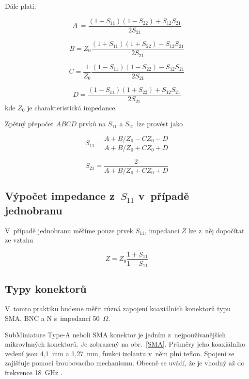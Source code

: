 \documentclass{protokol}
\newcommand\sparam{S}
\newcommand\impedance{Z}
\begin{document}
Dále platí:

\begin{equation}
	A~= \frac{(1+S_{11})(1-S_{22})+S_{12}S_{21}}{2S_{21}}
	\label{eq:A}
\end{equation}

\begin{equation}
	B = Z_0 \frac{(1+S_{11})(1+S_{22})-S_{12}S_{21}}{2S_{21}}
	\label{eq:B}
\end{equation}

\begin{equation}
	C = \frac{1}{Z_0} \frac{(1-S_{11})(1-S_{22})-S_{12}S_{21}}{2S_{21}}
	\label{eq:C}
\end{equation}

\begin{equation}
	D = \frac{(1-S_{11})(1+S_{22})+S_{12}S_{21}}{2S_{21}}
	\label{eq:D}
\end{equation}
kde $\impedance_{0}$ je charakteristická impedance.

Zpětný přepočet $ABCD$ prvků na $S_{11}$ a $S_{21}$ lze provést jako

\begin{equation}
	S_{11} = \frac{A+B/Z_0-CZ_0-D}{A+B/Z_0+CZ_0+D}
	\label{eq:s11}
\end{equation}

\begin{equation}
	S_{21} = \frac{2}{A+B/Z_0+CZ_0+D}
	\label{eq:s21}
\end{equation}

\subsection{Výpočet impedance z~$\sparam_{11}$ v~případě jednobranu}
V~případě jednobranu měříme pouze prvek $\sparam_{11}$, impedanci $\impedance$
lze z~něj dopočítat ze vztahu

\begin{equation}
	\impedance = \impedance_{0}\frac{1+\sparam_{11}}{1-\sparam_{11}}
	\label{eq:Z}
\end{equation}


\subsection{Typy konektorů}
V~tomto praktiku budeme měřit různá zapojení koaxiálních konektorů typu
SMA, BNC a N s~impedancí 50~$\Omega$.

SubMiniature Type-A neboli SMA konektor je jedním z~nejpoužívanějších
mikrovlnných konektorů. Je zobrazený na obr.~\ref{SMA}. Průměry jeho koaxiálního vedení jsou 4,1~mm a 1,27~mm,
funkci izolantu v~něm plní teflon.
Spojení se zajišťuje pomocí šroubovacího mechanismu.
Obecně se uvádí, že je vhodný až do frekvence 18~GHz \cite{rfhandbook}.
\end{document}

